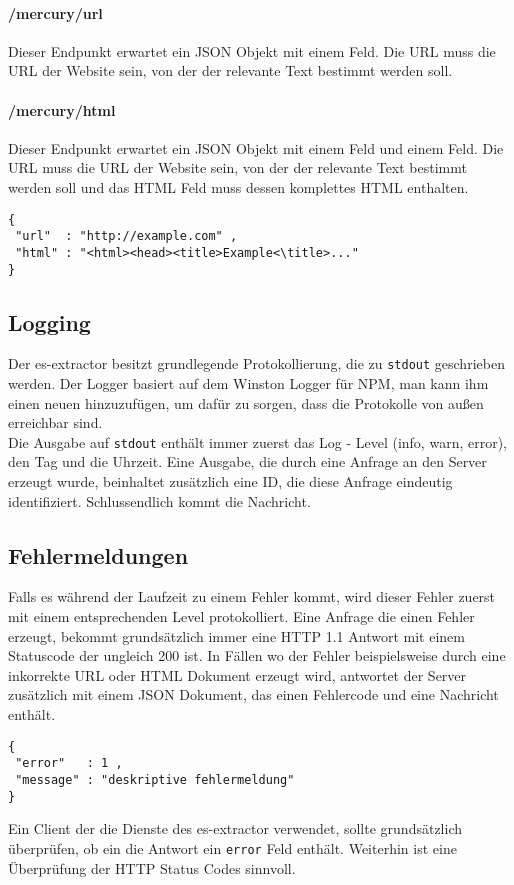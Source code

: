 \paragraph{/mercury/url} Dieser Endpunkt erwartet ein \ac{JSON} Objekt mit einem  Feld. Die URL muss die URL der Website sein, von der der relevante Text bestimmt werden soll.
\paragraph{/mercury/html} Dieser Endpunkt erwartet ein \ac{JSON} Objekt mit einem  Feld und einem  Feld. Die URL muss die URL der Website sein, von der der relevante Text bestimmt werden soll und das HTML Feld muss dessen komplettes HTML enthalten.
\begin{verbatim}
{
 "url"  : "http://example.com" , 
 "html" : "<html><head><title>Example<\title>..."
}
\end{verbatim}
\subsection{Logging}
Der es-extractor besitzt grundlegende Protokollierung, die zu \verb|stdout| geschrieben werden. Der Logger basiert auf dem Winston Logger für NPM, man kann ihm einen neuen  hinzuzufügen, um dafür zu sorgen, dass die Protokolle von außen erreichbar sind. \cite{winston2019} \\ 
Die Ausgabe auf \verb|stdout| enthält immer zuerst das Log - Level (info, warn, error), den Tag und die Uhrzeit. Eine Ausgabe, die durch eine Anfrage an den Server erzeugt wurde, beinhaltet zusätzlich eine ID, die diese Anfrage eindeutig identifiziert. Schlussendlich kommt die Nachricht.
\subsection{Fehlermeldungen}
Falls es während der Laufzeit zu einem Fehler kommt, wird dieser Fehler zuerst mit einem entsprechenden Level protokolliert. Eine Anfrage die einen Fehler erzeugt, bekommt grundsätzlich immer eine HTTP 1.1 Antwort mit einem Statuscode der ungleich 200 ist. In Fällen wo der Fehler beispielsweise durch eine inkorrekte URL oder HTML Dokument erzeugt wird, antwortet der Server zusätzlich mit einem JSON Dokument, das einen Fehlercode und eine Nachricht enthält.
\begin{verbatim}
{
 "error"   : 1 , 
 "message" : "deskriptive fehlermeldung"
}
\end{verbatim}
Ein Client der die Dienste des es-extractor verwendet, sollte grundsätzlich überprüfen, ob ein die Antwort ein \verb|error| Feld enthält. Weiterhin ist eine Überprüfung der HTTP Status Codes sinnvoll.

















